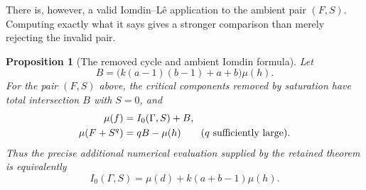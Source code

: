 \documentclass[11pt]{article}
\newtheorem{proposition}{Proposition}
\begin{document}
There is, however, a valid Iomdin--L\^e application to the ambient
pair \((F,S)\).  Computing exactly what it says gives a stronger
comparison than merely rejecting the invalid pair.

\begin{proposition}[The removed cycle and ambient Iomdin formula]
\label{prop:iomdin}
Let
\[
 B=\bigl(k(a-1)(b-1)+a+b\bigr)\mu(h).
\]
For the pair \((F,S)\) above, the critical components removed by
saturation have total intersection \(B\) with \(S=0\), and
\begin{align}
 \mu(f)&=I_0(\Gamma,S)+B,\label{eq:full-polar}\\
 \mu(F+S^q)&=qB-\mu(h)\qquad(q\ \hbox{sufficiently large}).
 \label{eq:iomdin}
\end{align}
Thus the precise additional numerical evaluation supplied by the
retained theorem is equivalently
\begin{equation}\label{eq:delta-S}
 \boxed{I_0(\Gamma,S)=\mu(d)+k(a+b-1)\mu(h).}
\end{equation}
\end{proposition}
\end{document}
